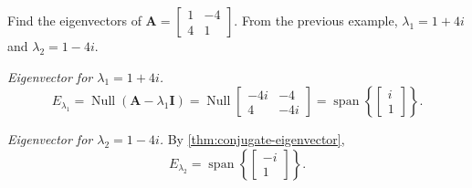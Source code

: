 \begin{example}
  Find the eigenvectors of $\mathbf{A} =
    \begin{bmatrix}
      1 & -4 \\ 4 & 1
    \end{bmatrix}
  $. From the previous example, $\lambda_1 = 1 + 4i$ and $\lambda_2 = 1 - 4i$.

  \medskip

  \emph{Eigenvector for $\lambda_1 = 1 + 4i$.}
  \[
    E_{\lambda_1} = \operatorname{Null}(\mathbf{A} - \lambda_1 \mathbf{I})
    = \operatorname{Null}
    \begin{bmatrix}
      -4i & -4  \\
      4   & -4i
    \end{bmatrix}
    = \operatorname{span}\left\{
    \begin{bmatrix}
      i \\ 1
    \end{bmatrix}
    \right\}
    .
  \]

  \emph{Eigenvector for $\lambda_2 = 1 - 4i$.} By \ref{thm:conjugate-eigenvector},
  \[
    E_{\lambda_2} = \operatorname{span}\left\{
    \begin{bmatrix}
      -i \\ 1
    \end{bmatrix}
    \right\}
    .
  \]
\end{example}
